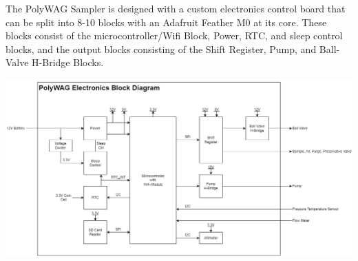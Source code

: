 \documentclass[11pt, letterpaper]{article}
\begin{document}
The PolyWAG Sampler is designed with a custom electronics control board that can be split into 8-10 blocks with an Adafruit Feather M0 at its core. These blocks consist of the microcontroller/Wifi Block, Power, RTC, and sleep control blocks, and the output blocks consisting of the Shift Register, Pump, and Ball-Valve H-Bridge Blocks. 

\begin{center}
	\includegraphics[scale=0.4]{./Assets/Electronics Block Diagram.png}
\end{center}
\end{document}
